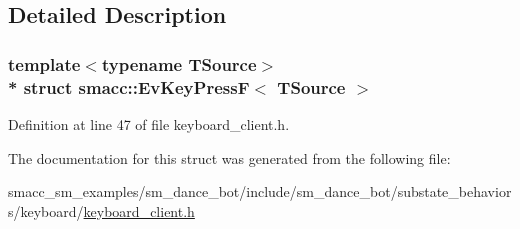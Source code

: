 \subsection{Detailed Description}
\subsubsection*{template$<$typename T\+Source$>$\\*
struct smacc\+::\+Ev\+Key\+Press\+F$<$ T\+Source $>$}



Definition at line 47 of file keyboard\+\_\+client.\+h.



The documentation for this struct was generated from the following file\+:\begin{DoxyCompactItemize}
\item 
smacc\+\_\+sm\+\_\+examples/sm\+\_\+dance\+\_\+bot/include/sm\+\_\+dance\+\_\+bot/substate\+\_\+behaviors/keyboard/\hyperlink{keyboard__client_8h}{keyboard\+\_\+client.\+h}\end{DoxyCompactItemize}
